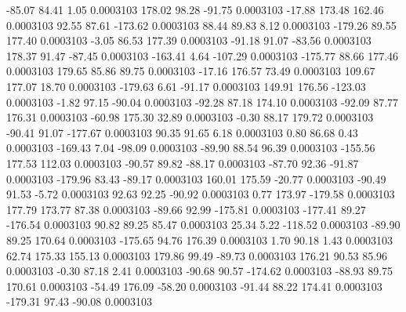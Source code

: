       -85.07       84.41        1.05     0.0003103
      178.02       98.28      -91.75     0.0003103
      -17.88      173.48      162.46     0.0003103
       92.55       87.61     -173.62     0.0003103
       88.44       89.83        8.12     0.0003103
     -179.26       89.55      177.40     0.0003103
       -3.05       86.53      177.39     0.0003103
      -91.18       91.07      -83.56     0.0003103
      178.37       91.47      -87.45     0.0003103
     -163.41        4.64     -107.29     0.0003103
     -175.77       88.66      177.46     0.0003103
      179.65       85.86       89.75     0.0003103
      -17.16      176.57       73.49     0.0003103
      109.67      177.07       18.70     0.0003103
     -179.63        6.61      -91.17     0.0003103
      149.91      176.56     -123.03     0.0003103
       -1.82       97.15      -90.04     0.0003103
      -92.28       87.18      174.10     0.0003103
      -92.09       87.77      176.31     0.0003103
      -60.98      175.30       32.89     0.0003103
       -0.30       88.17      179.72     0.0003103
      -90.41       91.07     -177.67     0.0003103
       90.35       91.65        6.18     0.0003103
        0.80       86.68        0.43     0.0003103
     -169.43        7.04      -98.09     0.0003103
      -89.90       88.54       96.39     0.0003103
     -155.56      177.53      112.03     0.0003103
      -90.57       89.82      -88.17     0.0003103
      -87.70       92.36      -91.87     0.0003103
     -179.96       83.43      -89.17     0.0003103
      160.01      175.59      -20.77     0.0003103
      -90.49       91.53       -5.72     0.0003103
       92.63       92.25      -90.92     0.0003103
        0.77      173.97     -179.58     0.0003103
      177.79      173.77       87.38     0.0003103
      -89.66       92.99     -175.81     0.0003103
     -177.41       89.27     -176.54     0.0003103
       90.82       89.25       85.47     0.0003103
       25.34        5.22     -118.52     0.0003103
      -89.90       89.25      170.64     0.0003103
     -175.65       94.76      176.39     0.0003103
        1.70       90.18        1.43     0.0003103
       62.74      175.33      155.13     0.0003103
      179.86       99.49      -89.73     0.0003103
      176.21       90.53       85.96     0.0003103
       -0.30       87.18        2.41     0.0003103
      -90.68       90.57     -174.62     0.0003103
      -88.93       89.75      170.61     0.0003103
      -54.49      176.09      -58.20     0.0003103
      -91.44       88.22      174.41     0.0003103
     -179.31       97.43      -90.08     0.0003103
